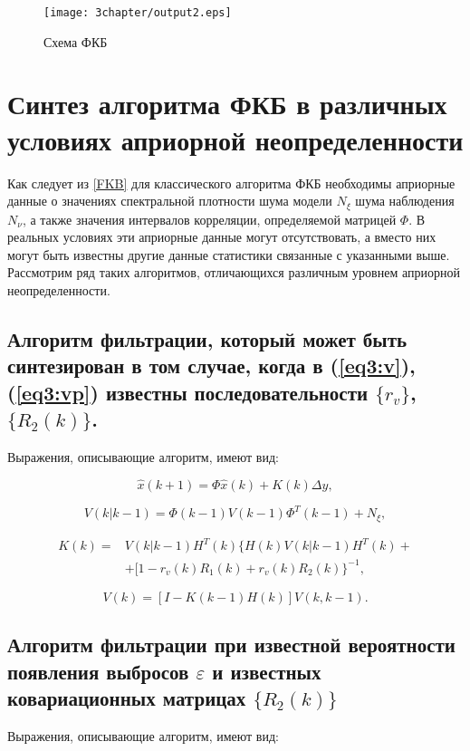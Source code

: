 \begin{figure} [h]
  \center
\texttt{[image: 3chapter/output2.eps]}
  \caption{Схема ФКБ}
  \label{img3:kalmanF}
\end{figure}

\section{Синтез алгоритма ФКБ в различных условиях априорной неопределенности}
Как следует из \ref{FKB} для классического алгоритма ФКБ необходимы априорные данные о значениях спектральной плотности шума модели $N_\xi$ шума наблюдения $N_\nu$, а также значения интервалов корреляции,  определяемой матрицей $\Phi$. В реальных условиях эти априорные данные могут отсутствовать, а вместо них могут быть известны другие данные статистики связанные с указанными выше.
Рассмотрим ряд таких алгоритмов, отличающихся различным уровнем априорной неопределенности.
\subsection{ Алгоритм фильтрации, который может быть синтезирован в том случае, когда в (\ref{eq3:v}), (\ref{eq3:vp}) известны последовательности $\{r_v\}$, $\{R_2(k)\}$.}
Выражения, описывающие алгоритм, имеют вид:

\begin{equation}\label{eq3:optim2}
\hat{x}(k+1)=\Phi\hat{x}(k)+K(k)\Delta y,
\end{equation}

\begin{equation}\label{eq3:optim2_3}
V(k|k-1)=\Phi(k-1)V(k-1)\Phi^T(k-1)+N_\xi,
\end{equation}

\begin{equation}\label{eq3:optim2_4}
\begin{split}
K(k)=&V(k|k-1)H^T(k)\{H(k)V(k|k-1)H^T(k)+\\
&+[1-r_v(k)R_1(k)+r_v(k)R_2(k)\}^{-1},
\end{split}
\end{equation}

\begin{equation}\label{eq3:optim2_5}
V(k)=[I-K(k-1)H(k)]V(k,k-1).
\end{equation}

\subsection{ Алгоритм фильтрации при известной вероятности появления выбросов $\varepsilon$ и известных ковариационных матрицах $\{R_2(k)\}$} 
Выражения, описывающие алгоритм, имеют вид:

